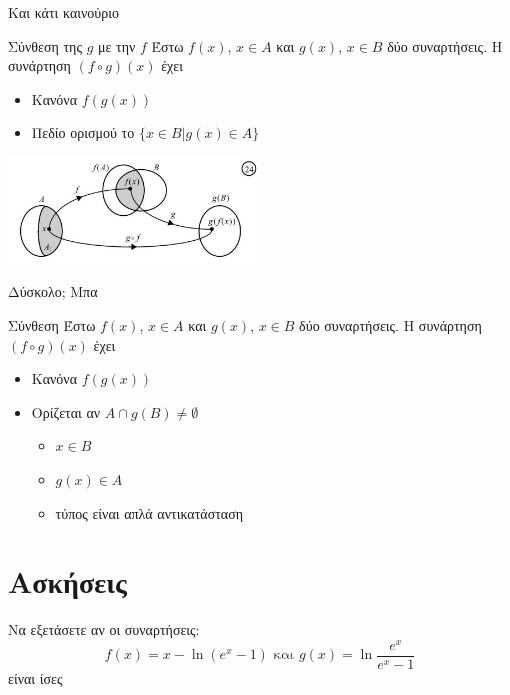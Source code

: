 \documentclass{presentation}
\begin{document}
\begin{frame}{Και κάτι καινούριο}
  \begin{block}{Σύνθεση της $g$ με την $f$}
    Έστω $f(x)$, $x\in Α$ και $g(x)$, $x\in Β$ δύο συναρτήσεις. Η συνάρτηση $(f\circ g)(x)$ έχει
    \begin{itemize}
      \item Κανόνα $f(g(x))$
      \item Πεδίο ορισμού το $\{x\in Β | g(x)\in Α \}$
    \end{itemize}
  \end{block}
  \centering
  \includegraphics[width=0.5\textwidth]{"images/1.2 Σύνθεση.png"}
\end{frame}

\begin{frame}{Δύσκολο; Μπα}
  \begin{block}{Σύνθεση}
    Έστω $f(x)$, $x\in Α$ και $g(x)$, $x\in Β$ δύο συναρτήσεις. Η συνάρτηση $(f\circ g)(x)$ έχει
    \begin{itemize}
      \item Κανόνα $f(g(x))$
      \item Ορίζεται αν $Α\cap g(Β)\ne \emptyset$
            \begin{itemize}
              \item<2-> $x\in Β$
              \item<3-> $g(x)\in Α$
              \item<4-> τύπος είναι απλά αντικατάσταση
            \end{itemize}
    \end{itemize}
  \end{block}
\end{frame}

\moodle

\section{Ασκήσεις}

\exercises

\begin{askisi}
  Να εξετάσετε αν οι συναρτήσεις:
  $$f(x)=x-\ln (e^x-1) \text{ και } g(x)=\ln\frac{e^x}{e^x-1}$$
  είναι ίσες

\end{askisi}
\end{document}

